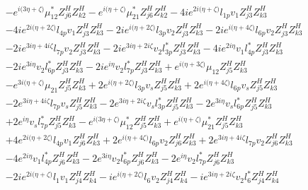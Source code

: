  \begin{align} 
 & - e^{i \Big(3 \eta +\zeta \Big)} \mu_{12}^* Z_{{j 6}}^{H} Z_{{k 2}}^{H} - e^{i \Big(\eta +\zeta \Big)} \mu_{21}^* Z_{{j 6}}^{H} Z_{{k 2}}^{H} -4 i e^{2 i \Big(\eta +\zeta \Big)} l_{1p} v_1 Z_{{j 3}}^{H} Z_{{k 3}}^{H} \nonumber \\ 
 &-4 i e^{2 i \Big(\eta +2 \zeta \Big)} l_{4p} v_1 Z_{{j 3}}^{H} Z_{{k 3}}^{H} -2 i e^{i \Big(\eta +2 \zeta \Big)} l_{3p} v_2 Z_{{j 3}}^{H} Z_{{k 3}}^{H} -2 i e^{i \Big(\eta +4 \zeta \Big)} l_{6p} v_2 Z_{{j 3}}^{H} Z_{{k 3}}^{H} \nonumber \\ 
 &-2 i e^{3 i \eta +4 i \zeta } l_{7p} v_2 Z_{{j 3}}^{H} Z_{{k 3}}^{H} -2 i e^{3 i \eta +2 i \zeta } v_2 l_{3p}^* Z_{{j 3}}^{H} Z_{{k 3}}^{H} -4 i e^{2 i \eta } v_1 l_{4p}^* Z_{{j 3}}^{H} Z_{{k 3}}^{H} \nonumber \\ 
 &-2 i e^{3 i \eta } v_2 l_{6p}^* Z_{{j 3}}^{H} Z_{{k 3}}^{H} -2 i e^{i \eta } v_2 l_{7p}^* Z_{{j 3}}^{H} Z_{{k 3}}^{H} +e^{i \Big(\eta +3 \zeta \Big)} \mu_{12} Z_{{j 5}}^{H} Z_{{k 3}}^{H} \nonumber \\ 
 &- e^{3 i \Big(\eta +\zeta \Big)} \mu_{21} Z_{{j 5}}^{H} Z_{{k 3}}^{H} +2 e^{i \Big(\eta +2 \zeta \Big)} l_{3p} v_s Z_{{j 5}}^{H} Z_{{k 3}}^{H} +2 e^{i \Big(\eta +4 \zeta \Big)} l_{6p} v_s Z_{{j 5}}^{H} Z_{{k 3}}^{H} \nonumber \\ 
 &-2 e^{3 i \eta +4 i \zeta } l_{7p} v_s Z_{{j 5}}^{H} Z_{{k 3}}^{H} -2 e^{3 i \eta +2 i \zeta } v_s l_{3p}^* Z_{{j 5}}^{H} Z_{{k 3}}^{H} -2 e^{3 i \eta } v_s l_{6p}^* Z_{{j 5}}^{H} Z_{{k 3}}^{H} \nonumber \\ 
 &+2 e^{i \eta } v_s l_{7p}^* Z_{{j 5}}^{H} Z_{{k 3}}^{H} - e^{i \Big(3 \eta +\zeta \Big)} \mu_{12}^* Z_{{j 5}}^{H} Z_{{k 3}}^{H} +e^{i \Big(\eta +\zeta \Big)} \mu_{21}^* Z_{{j 5}}^{H} Z_{{k 3}}^{H} \nonumber \\ 
 &+4 e^{2 i \Big(\eta +2 \zeta \Big)} l_{4p} v_1 Z_{{j 6}}^{H} Z_{{k 3}}^{H} +2 e^{i \Big(\eta +4 \zeta \Big)} l_{6p} v_2 Z_{{j 6}}^{H} Z_{{k 3}}^{H} +2 e^{3 i \eta +4 i \zeta } l_{7p} v_2 Z_{{j 6}}^{H} Z_{{k 3}}^{H} \nonumber \\ 
 &-4 e^{2 i \eta } v_1 l_{4p}^* Z_{{j 6}}^{H} Z_{{k 3}}^{H} -2 e^{3 i \eta } v_2 l_{6p}^* Z_{{j 6}}^{H} Z_{{k 3}}^{H} -2 e^{i \eta } v_2 l_{7p}^* Z_{{j 6}}^{H} Z_{{k 3}}^{H} \nonumber \\ 
 &-2 i e^{2 i \Big(\eta +\zeta \Big)} l_1 v_1 Z_{{j 4}}^{H} Z_{{k 4}}^{H} -i e^{i \Big(\eta +2 \zeta \Big)} l_6 v_2 Z_{{j 4}}^{H} Z_{{k 4}}^{H} -i e^{3 i \eta +2 i \zeta } v_2 l_6^* Z_{{j 4}}^{H} Z_{{k 4}}^{H} \nonumber \\ 

\end{align}
